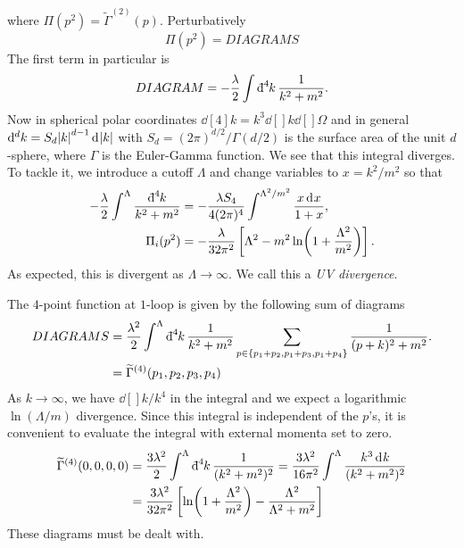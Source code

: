 where $\Pi(p^2) = \widetilde{\Gamma}^{(2)}(p)$.
Perturbatively
\begin{equation}
  \Pi(p^2) = DIAGRAMS
\end{equation}
The first term in particular is
\begin{equation}
  DIAGRAM = -\frac{\lambda}{2} \int \bdd[4]{k} \frac{1}{k^2+ m^2}.
\end{equation}
Now in spherical polar coordinates $\dd[4]{k} = k^{3} \dd[]{k} \dd[]{\Omega}$  and in general $\dd[d]{k} = S_d \abs{k}^{d-1} \dd[]{\abs{k}}$  with $S_d = (2 \pi)^{d / 2} / \Gamma(d / 2)$ is the surface area of the unit $d$-sphere, where $\Gamma$ is the Euler-Gamma function.
We see that this integral diverges.
To tackle it, we introduce a cutoff  $\Lambda$ and change variables to $x = k^2 / m^2$ so that
 \begin{align}
   -\frac{\lambda}{2} \int^{\Lambda} \frac{\bdd[4]{k}}{k^2 +m^2} &= -\frac{\lambda S_4}{4 (2 \pi)^4} \int^{\Lambda^2 / m^2} \frac{x \dd[]{x}}{1 + x}, \\
   \Pi_i(p^2) &= -\frac{\lambda}{32 \pi^2} \left[ \Lambda^2 - m^2 \ln(1 + \frac{\Lambda^2}{m^2}) \right]. \label{eq:9-pi}
\end{align}
As expected, this is divergent as $\Lambda \to \infty$. We call this a \emph{UV divergence}.

The $4$-point function at $1$-loop is given by the following sum of diagrams
\begin{align}
  DIAGRAMS &= \frac{\lambda^2}{2} \int^\Lambda \bdd[4]{k} \frac{1}{k^2+ m^2} \sum_{p \in \{p_1 + p_2, p_1 + p_3, p_1 + p_4\}} \frac{1}{(p + k)^2 + m^2}. \\
	   &= \widetilde{\Gamma}^{(4)}(p_1, p_2, p_3, p_4)
\end{align}
As $k \to \infty$, we have $\dd[]{k} / k^4$ in the integral and we expect a logarithmic $\ln(\Lambda / m)$ divergence.
Since this integral is independent of the $p$'s, it is convenient to evaluate the integral with external momenta set to zero.
\begin{align}
  \widetilde{\Gamma}^{(4)}(0,0,0,0) &= \frac{3 \lambda^2}{2} \int^\Lambda \bdd[4]{k} \frac{1}{(k^2 + m^2)^2} = \frac{3 \lambda^2}{16 \pi^2} \int^\Lambda \frac{k^3 \dd[]{k}}{(k^2+ m^2)^2} \\
				    &= \frac{3 \lambda^2}{32 \pi^2} \left[ \ln(1 + \frac{\Lambda^2}{m^2}) - \frac{\Lambda^2}{\Lambda^2 + m^2} \right]
\end{align}
These diagrams must be dealt with.

